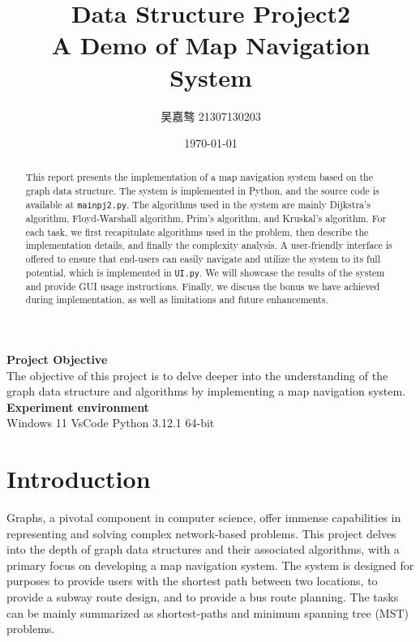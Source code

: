 \documentclass[UTF8]{ctexart}
\title{\textbf{Data Structure Project2}\\{\Large A Demo of Map Navigation System}}
\author{吴嘉骜 21307130203}
\date{\today}
\begin{document}
\maketitle
\begin{abstract}
    \normalsize
    \noindent
    This report presents the implementation of a map navigation system based on the graph data structure.
    The system is implemented in Python, and the source code is available at \texttt{mainpj2.py}.
    The algorithms used in the system are mainly Dijkstra's algorithm, Floyd-Warshall algorithm, Prim's algorithm, and Kruskal's algorithm.
    For each task, we first recapitulate algorithms used in the problem, then describe the implementation details, and finally the complexity analysis.
    A user-friendly interface is offered to ensure that end-users can easily navigate and utilize the system to its full potential, which is implemented in \texttt{UI.py}.
    We will showcase the results of the system and provide GUI usage instructions.
    Finally, we discuss the bonus we have achieved during implementation, as well as limitations and future enhancements.
\end{abstract}

\noindent
\textbf {Project Objective}\\  The objective of this project is to delve deeper 
into the understanding of the graph data structure and algorithms by implementing a map navigation system.\\
\noindent
\textbf {Experiment environment} \\
    Windows 11 VsCode Python 3.12.1 64-bit

\section{Introduction}
\setlength{\parindent}{0pt}
Graphs, a pivotal component in computer science, offer immense capabilities in representing and solving complex network-based problems.
This project delves into the depth of graph data structures and their associated algorithms,
with a primary focus on developing a map navigation system.
The system is designed for purposes to provide users with the shortest path between two locations, to provide a
subway route design, and to provide a bus route planning. 
The tasks can be mainly summarized as shortest-paths and minimum spanning tree (MST) problems.
\end{document}
